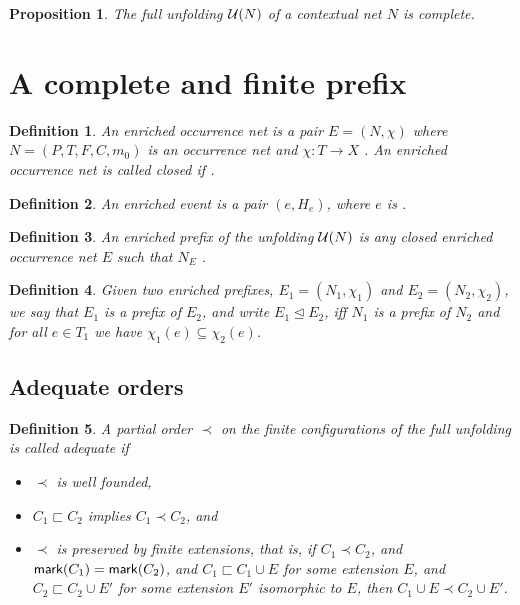 \documentclass{article}
\newtheorem{definition}{Definition}
\newtheorem{proposition}{Proposition}
\newtheorem{lemma}{Lemma}
\begin{document}
\begin{proposition} The full unfolding $\mathcal{U}(N)$ of a contextual net $N$ is
complete. 
\end{proposition}

\section{A complete and finite prefix}

\begin{definition} An \emph{enriched occurrence net} is a pair $E = (N, \chi)$
where $N = (P, T, F, C, m_0)$ is an occurrence net and $\chi : T \to X$
.  An enriched occurrence net is called \emph{closed} if
.
\end{definition}


\begin{definition} An \emph{enriched event} is a pair $(e, H_e)$, where $e$ is
.
\end{definition}

\begin{definition} An \emph{enriched prefix} of the unfolding $\mathcal{U}(N)$ is any
\emph{closed} enriched occurrence net $E$ such that $N_E$ .
\end{definition}

\begin{definition} Given two enriched prefixes, $E_1 = (N_1, \chi_1)$ and $E_2
= (N_2, \chi_2)$, we say that $E_1$ is \emph{a prefix} of $E_2$, and write $E_1
\unlhd E_2$, iff $N_1$ is a prefix of $N_2$ and for all $e \in T_1$ we have
$\chi_1 (e) \subseteq \chi_2 (e)$.
\end{definition}



\subsection{Adequate orders}

\begin{definition} \label{def:adequate} A partial order $\prec$ on the finite
configurations of the full unfolding is called \emph{adequate} if
\begin{itemize} \item $\prec$ is well founded, \item $C_1 \sqsubset C_2$
implies $C_1 \prec C_2$, and \item $\prec$ is preserved by finite extensions,
that is,  if $C_1 \prec C_2$, and $\mathsf{mark }{(C_1)} = \mathsf{mark }{(C_2)}$, and $C_1
\sqsubset C_1 \cup E$ for some extension $E$, and $C_2 \sqsubset C_2 \cup E'$
for some extension $E'$ isomorphic to $E$, then $C_1 \cup E \prec C_2 \cup E'$.
\end{itemize}
\end{definition}
\end{document}
